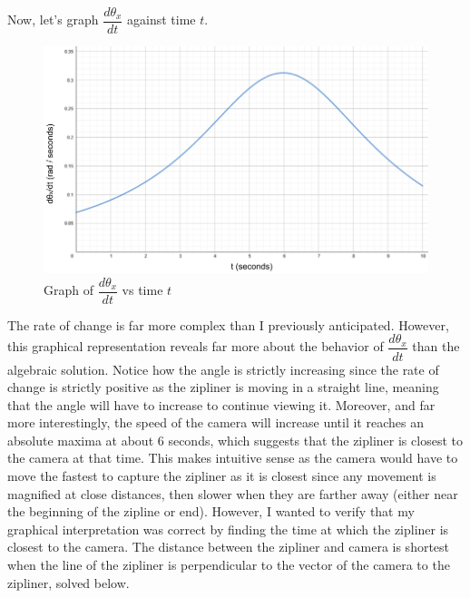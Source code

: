 \documentclass[12pt]{article}
\begin{document}
\newpage
Now, let's graph $\dfrac{d\theta_x}{dt}$ against time $t$.

\vspace{20pt}

\begin{figure}[H]
\centering
\includegraphics[width=450pt]{img/graph1.png}
\caption{\label{fig:4}Graph of $\dfrac{d\theta_x}{dt}$ vs time $t$}
\end{figure}

The rate of change is far more complex than I previously anticipated. However, this graphical representation reveals far more about the behavior of $\dfrac{d\theta_x}{dt}$ than the algebraic solution. Notice how the angle is strictly increasing since the rate of change is strictly positive as the zipliner is moving in a straight line, meaning that the angle will have to increase to continue viewing it. Moreover, and far more interestingly, the speed of the camera will increase until it reaches an absolute maxima at about 6 seconds, which suggests that the zipliner is closest to the camera at that time. This makes intuitive sense as the camera would have to move the fastest to capture the zipliner as it is closest since any movement is magnified at close distances, then slower when they are farther away (either near the beginning of the zipline or end). However, I wanted to verify that my graphical interpretation was correct by finding the time at which the zipliner is closest to the camera. The distance between the zipliner and camera is shortest when the line of the zipliner is perpendicular to the vector of the camera to the zipliner, solved below.
\end{document}
